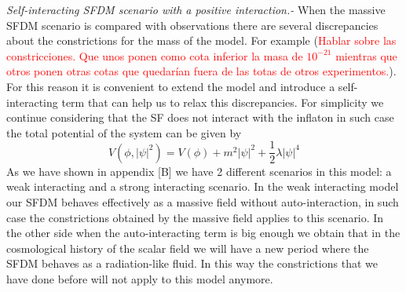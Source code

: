 \documentclass[twocolumn,           %
               showpacs,            %
               preprintnumbers,     %
               aps,                 %
               prl,          	    %
               letterpaper,             %
               superscriptaddress,      %
               nofootinbib,         %
               tightenlines,        %
               floats,floatfix      %
               ,usenatbib,
               ]{revtex4-1}
\begin{document}
\textit{Self-interacting SFDM scenario with a positive interaction.-} When the massive SFDM scenario is compared with observations there are several discrepancies about the constrictions for the mass of the model. For example (\textcolor{red}{Hablar sobre las constricciones. Que unos ponen como cota inferior la masa de $10^{-21}$ mientras que otros ponen otras cotas que quedarían fuera de las totas de otros experimentos.}). For this reason it is convenient to extend the model and introduce a self-interacting term that can help us to relax this discrepancies. For simplicity we continue considering that the SF does not interact with the inflaton in such case the total potential of the system can be given by
\begin{equation}
V(\phi,|\psi|^2)=V(\phi)+m^2|\psi|^2+\frac{1}{2}\lambda|\psi|^4
\end{equation}
As we have shown in appendix [B] we have 2 different scenarios in this model: a weak interacting and a strong interacting scenario. In the weak interacting model our SFDM behaves effectively as a massive field without auto-interaction, in such case the constrictions obtained by the massive field applies to this scenario. In the other side when the auto-interacting term is big enough we obtain that in the cosmological history of the scalar field we will have a new period where the SFDM behaves as a radiation-like fluid. In this way the constrictions that we have done before will not apply to this model anymore.
\end{document}
